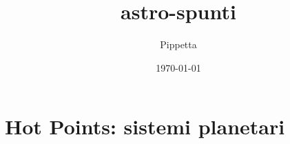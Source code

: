 \documentclass[oneside,12pt,fleqn]{memoir}		%
\author{Pippetta}
\title{astro-spunti}
\date{\today}
\begin{document}
\maketitle
\tableofcontents*


\part{Hot Points: sistemi planetari }



\listoffigures

\mainmatter



%


%
%

%
%

%


%
%


%

\clearpage
{}
\printindex
\end{document}
